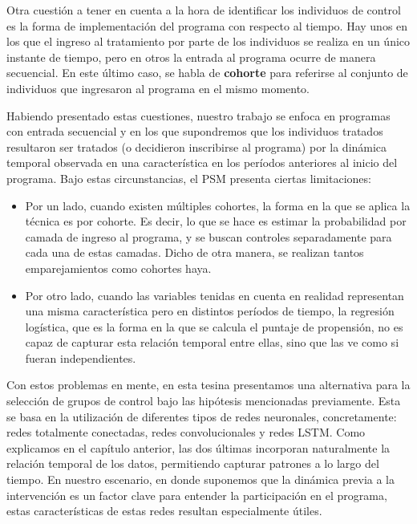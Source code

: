 \documentclass[../main.tex]{subfiles}
\begin{document}
Otra cuestión a tener en cuenta a la hora de identificar los individuos de control es la
forma de implementación del programa con respecto al tiempo. Hay unos en los que el
ingreso al tratamiento por parte de los individuos se realiza en un único instante de
tiempo, pero en otros la entrada al programa ocurre de manera secuencial. En este último
caso, se habla de \textbf{cohorte} para referirse al conjunto de individuos que ingresaron
al programa en el mismo momento.

Habiendo presentado estas cuestiones, nuestro trabajo se enfoca en programas con entrada
secuencial y en los que supondremos que los individuos tratados resultaron ser tratados (o
decidieron inscribirse al programa) por la dinámica temporal observada en una
característica en los períodos anteriores al inicio del programa. Bajo estas
circunstancias, el PSM presenta ciertas limitaciones:
\begin{itemize}
    \item Por un lado, cuando existen múltiples cohortes, la forma en la que se aplica la
    técnica es por cohorte. Es decir, lo que se hace es estimar la probabilidad por camada
    de ingreso al programa, y se buscan controles separadamente para cada una de estas
    camadas. Dicho de otra manera, se realizan tantos emparejamientos como cohortes haya.
    \item Por otro lado, cuando las variables tenidas en cuenta en realidad representan
    una misma característica pero en distintos períodos de tiempo, la regresión logística,
    que es la forma en la que se calcula el puntaje de propensión, no es capaz de capturar
    esta relación temporal entre ellas, sino que las ve como si fueran independientes.
\end{itemize}

Con estos problemas en mente, en esta tesina presentamos una alternativa para la selección
de grupos de control bajo las hipótesis mencionadas previamente. Esta se basa en la
utilización de diferentes tipos de redes neuronales, concretamente: redes totalmente
conectadas, redes convolucionales y redes LSTM. Como explicamos en el capítulo anterior,
las dos últimas incorporan naturalmente la relación temporal de los datos, permitiendo
capturar patrones a lo largo del tiempo. En nuestro escenario, en donde suponemos que la
dinámica previa a la intervención es un factor clave para entender la participación
en el programa, estas características de estas redes resultan especialmente útiles.
\end{document}
